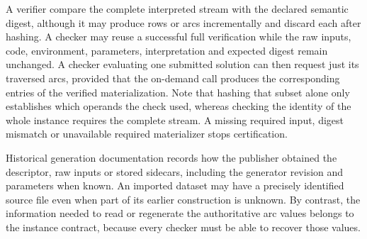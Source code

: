 A verifier \must{} compare the complete interpreted stream with the declared semantic digest, although it may produce rows or arcs incrementally and discard each after hashing. A checker may reuse a successful full verification while the raw inputs, code, environment, parameters, interpretation and expected digest remain unchanged. A checker evaluating one submitted solution can then request just its traversed arcs, provided that the on-demand call produces the corresponding entries of the verified materialization. Note that hashing that subset alone only establishes which operands the check used, whereas checking the identity of the whole instance requires the complete stream. A missing required input, digest mismatch or unavailable required materializer stops certification.

Historical generation documentation records how the publisher obtained the descriptor, raw inputs or stored sidecars, including the generator revision and parameters when known. An imported dataset may have a precisely identified source file even when part of its earlier construction is unknown. By contrast, the information needed to read or regenerate the authoritative arc values belongs to the instance contract, because every checker must be able to recover those values.
